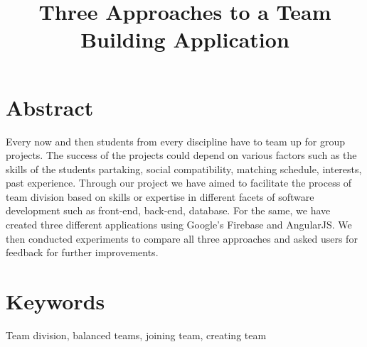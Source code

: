 \documentclass[conference]{IEEEtran}
\begin{document}
\title{Three Approaches to a Team Building Application}

\author{
}


\maketitle

\section{Abstract}
Every now and then students from every discipline have to team up for group projects. The success of the projects could depend on various factors such as the skills of the students partaking, social compatibility, matching schedule, interests, past experience. Through our project we have aimed to facilitate the process of team division based on skills or expertise in different facets of software development such as front-end, back-end, database. For the same, we have created three different applications using Google's Firebase and AngularJS. We then conducted experiments to compare all three approaches and asked users for feedback for further improvements.      
\section{Keywords}
Team division, balanced teams, joining team, creating team
\end{document}
